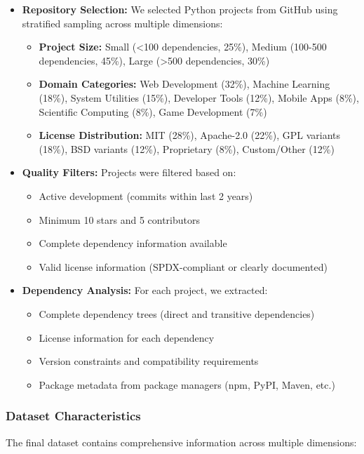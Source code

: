 \begin{itemize}
    \item \textbf{Repository Selection:} We selected Python projects from GitHub using stratified sampling across multiple dimensions:
    \begin{itemize}
        \item \textbf{Project Size:} Small (<100 dependencies, 25\%), Medium (100-500 dependencies, 45\%), Large (>500 dependencies, 30\%)
        \item \textbf{Domain Categories:} Web Development (32\%), Machine Learning (18\%), System Utilities (15\%), Developer Tools (12\%), Mobile Apps (8\%), Scientific Computing (8\%), Game Development (7\%)
        \item \textbf{License Distribution:} MIT (28\%), Apache-2.0 (22\%), GPL variants (18\%), BSD variants (12\%), Proprietary (8\%), Custom/Other (12\%)
    \end{itemize}
    
    \item \textbf{Quality Filters:} Projects were filtered based on:
    \begin{itemize}
        \item Active development (commits within last 2 years)
        \item Minimum 10 stars and 5 contributors
        \item Complete dependency information available
        \item Valid license information (SPDX-compliant or clearly documented)
    \end{itemize}
    
    \item \textbf{Dependency Analysis:} For each project, we extracted:
    \begin{itemize}
        \item Complete dependency trees (direct and transitive dependencies)
        \item License information for each dependency
        \item Version constraints and compatibility requirements
        \item Package metadata from package managers (npm, PyPI, Maven, etc.)
    \end{itemize}
\end{itemize}

\subsubsection{Dataset Characteristics}
The final dataset contains comprehensive information across multiple dimensions:

